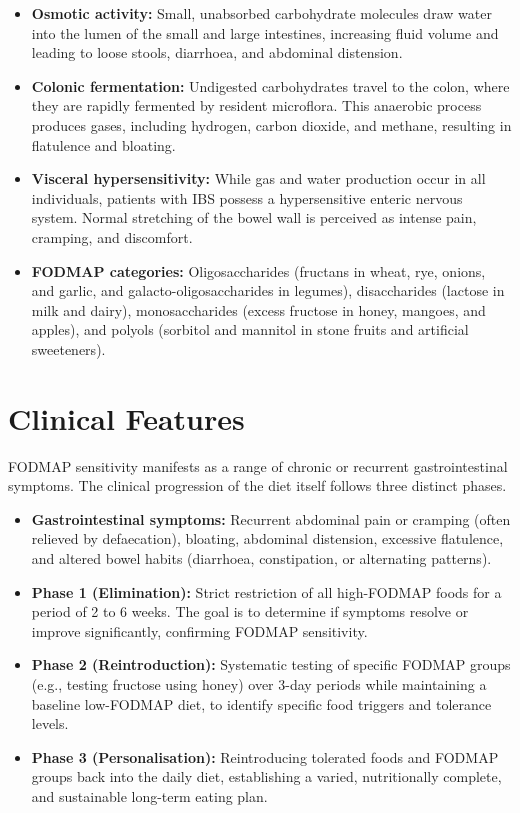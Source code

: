 \begin{itemize}
    \item \textbf{Osmotic activity:} Small, unabsorbed carbohydrate molecules draw water into the lumen of the small and large intestines, increasing fluid volume and leading to loose stools, diarrhoea, and abdominal distension.
    \item \textbf{Colonic fermentation:} Undigested carbohydrates travel to the colon, where they are rapidly fermented by resident microflora. This anaerobic process produces gases, including hydrogen, carbon dioxide, and methane, resulting in flatulence and bloating.
    \item \textbf{Visceral hypersensitivity:} While gas and water production occur in all individuals, patients with IBS possess a hypersensitive enteric nervous system. Normal stretching of the bowel wall is perceived as intense pain, cramping, and discomfort.
    \item \textbf{FODMAP categories:} Oligosaccharides (fructans in wheat, rye, onions, and garlic, and galacto-oligosaccharides in legumes), disaccharides (lactose in milk and dairy), monosaccharides (excess fructose in honey, mangoes, and apples), and polyols (sorbitol and mannitol in stone fruits and artificial sweeteners).
\end{itemize}

\section*{Clinical Features}
FODMAP sensitivity manifests as a range of chronic or recurrent gastrointestinal symptoms. The clinical progression of the diet itself follows three distinct phases.

\begin{itemize}
    \item \textbf{Gastrointestinal symptoms:} Recurrent abdominal pain or cramping (often relieved by defaecation), bloating, abdominal distension, excessive flatulence, and altered bowel habits (diarrhoea, constipation, or alternating patterns).
    \item \textbf{Phase 1 (Elimination):} Strict restriction of all high-FODMAP foods for a period of 2 to 6 weeks. The goal is to determine if symptoms resolve or improve significantly, confirming FODMAP sensitivity.
    \item \textbf{Phase 2 (Reintroduction):} Systematic testing of specific FODMAP groups (e.g., testing fructose using honey) over 3-day periods while maintaining a baseline low-FODMAP diet, to identify specific food triggers and tolerance levels.
    \item \textbf{Phase 3 (Personalisation):} Reintroducing tolerated foods and FODMAP groups back into the daily diet, establishing a varied, nutritionally complete, and sustainable long-term eating plan.
\end{itemize}

